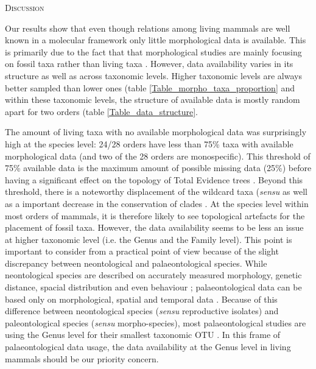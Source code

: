 \documentclass[12pt,letterpaper]{article}
\renewcommand{\section}[1]{%
\bigskip
\begin{center}
\begin{Large}
\normalfont\scshape #1
\medskip
\end{Large}
\end{center}}
\renewcommand{\subsection}[1]{%
\bigskip
\begin{center}
\begin{large}
\normalfont\itshape #1
\end{large}
\end{center}}
\begin{document}


%
%

\section{Discussion}
Our results show that even though relations among living mammals are well known in a molecular framework \citep[e.g.][]{FritzTree,meredithimpacts2011,May-Collado-PeerJ} only little morphological data is available.
This is primarily due to the fact that that morphological studies are mainly focusing on fossil taxa rather than living taxa \citep[e.g.][]{O'Leary08022013,ni2013oldest}.
However, data availability varies in its structure as well as across taxonomic levels.
Higher taxonomic levels are always better sampled than lower ones (table \ref{Table_morpho_taxa_proportion} and within these taxonomic levels, the structure of available data is mostly random apart for two orders (table \ref{Table_data_structure}.

The amount of living taxa with no available morphological data was surprisingly high at the species level: 24/28 orders have less than 75\% taxa with available morphological data (and two of the 28 orders are monospecific).
This threshold of 75\% available data is the maximum amount of possible missing data (25\%) before having a significant effect on the topology of Total Evidence trees \citep{GuillermeCooper}.
Beyond this threshold, there is a noteworthy displacement of the wildcard taxa (\textit{sensu} \citep{kearneyfragmentary2002} as well as a important decrease in the conservation of clades \citep{GuillermeCooper}.
At the species level within most orders of mammals, it is therefore likely to see topological artefacts for the placement of fossil taxa.
However, the data availability seems to be less an issue at higher taxonomic level (i.e.
the Genus and the Family level).
This point is important to consider from a practical point of view because of the slight discrepancy between neontological and palaeontological species.
While neontological species are described on accurately measured morphology, genetic distance, spacial distribution and even behaviour \citep[e.g.][]{kellymolecular2014}; palaeontological data can be based only on morphological, spatial and temporal data \citep[e.g.][]{ni2013oldest}.
Because of this difference between neontological species (\textit{sensu} reproductive isolates) and paleontological species (\textit{sensu} morpho-species), most palaeontological studies are using the Genus level for their smallest taxonomic OTU \citep[e.g.][]{ni2013oldest,O'Leary08022013}.
In this frame of palaeontological data usage, the data availability at the Genus level in living mammals should be our priority concern.
\end{document}
